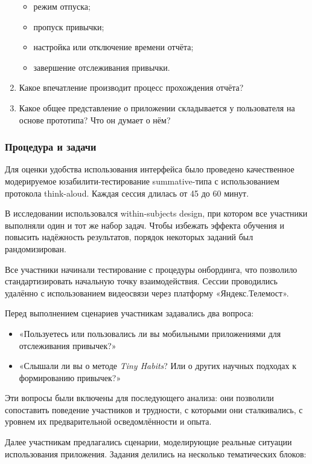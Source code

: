 \documentclass[pdflatex,sn-mathphys-num]{sn-jnl}%
\theoremstyle{thmstyleone}%
\theoremstyle{thmstyletwo}%
\theoremstyle{thmstylethree}%
\begin{document}
\begin{enumerate}
    \begin{itemize}
      \item режим отпуска;
      \item пропуск привычки;
      \item настройка или отключение времени отчёта;
      \item завершение отслеживания привычки.
    \end{itemize}
  \item Какое впечатление производит процесс прохождения отчёта?
  \item Какое общее представление о приложении складывается у пользователя на основе прототипа? Что он думает о нём?
\end{enumerate}

\subsubsection{Процедура и задачи}

Для оценки удобства использования интерфейса было проведено качественное модерируемое юзабилити-тестирование summative-типа с использованием протокола think-aloud. Каждая сессия длилась от 45 до 60 минут.

В исследовании использовался within-subjects design, при котором все участники выполняли один и тот же набор задач. Чтобы избежать эффекта обучения и повысить надёжность результатов, порядок некоторых заданий был рандомизирован.

Все участники начинали тестирование с процедуры онбординга, что позволило стандартизировать начальную точку взаимодействия. Сессии проводились удалённо с использованием видеосвязи через платформу «Яндекс.Телемост».

Перед выполнением сценариев участникам задавались два вопроса:

\begin{itemize}
\item «Пользуетесь или пользовались ли вы мобильными приложениями для отслеживания привычек?»
\item «Слышали ли вы о методе \textit{Tiny Habits}? Или о других научных подходах к формированию привычек?»
\end{itemize}

Эти вопросы были включены для последующего анализа: они позволили сопоставить поведение участников и трудности, с которыми они сталкивались, с уровнем их предварительной осведомлённости и опыта.

Далее участникам предлагались сценарии, моделирующие реальные ситуации использования приложения. Задания делились на несколько тематических блоков:
\end{document}

